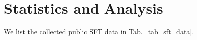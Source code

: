   


\section{Statistics and Analysis}

We list the collected public SFT data in Tab.~\ref{tab_sft_data}. 



